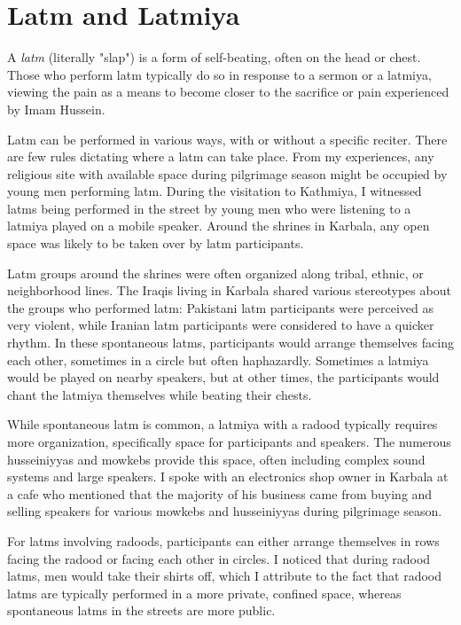 \section{Latm and Latmiya}

A \emph{latm} (literally "slap") is a form of self-beating, often on the head or chest. Those who perform latm typically do so in response to a sermon or a latmiya, viewing the pain as a means to become closer to the sacrifice or pain experienced by Imam Hussein.

Latm can be performed in various ways, with or without a specific reciter. There are few rules dictating where a latm can take place. From my experiences, any religious site with available space during pilgrimage season might be occupied by young men performing latm. During the visitation to Kathmiya, I witnessed latms being performed in the street by young men who were listening to a latmiya played on a mobile speaker. Around the shrines in Karbala, any open space was likely to be taken over by latm participants.

Latm groups around the shrines were often organized along tribal, ethnic, or neighborhood lines. The Iraqis living in Karbala shared various stereotypes about the groups who performed latm: Pakistani latm participants were perceived as very violent, while Iranian latm participants were considered to have a quicker rhythm. In these spontaneous latms, participants would arrange themselves facing each other, sometimes in a circle but often haphazardly. Sometimes a latmiya would be played on nearby speakers, but at other times, the participants would chant the latmiya themselves while beating their chests.

While spontaneous latm is common, a latmiya with a radood typically requires more organization, specifically space for participants and speakers. The numerous husseiniyyas and mowkebs provide this space, often including complex sound systems and large speakers. I spoke with an electronics shop owner in Karbala at a cafe who mentioned that the majority of his business came from buying and selling speakers for various mowkebs and husseiniyyas during pilgrimage season.

For latms involving radoods, participants can either arrange themselves in rows facing the radood or facing each other in circles. I noticed that during radood latms, men would take their shirts off, which I attribute to the fact that radood latms are typically performed in a more private, confined space, whereas spontaneous latms in the streets are more public.

